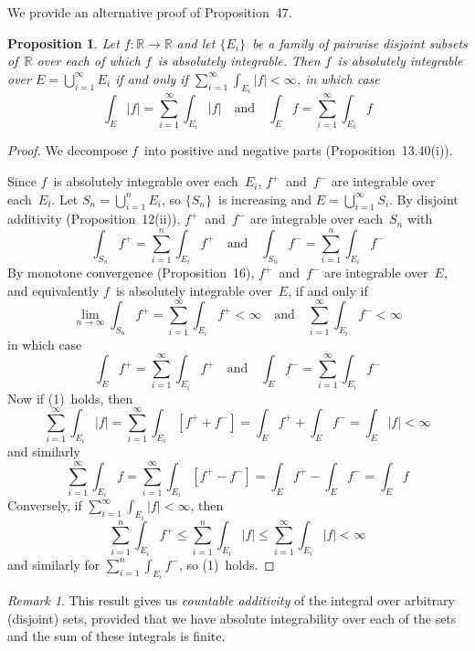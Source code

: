 \documentclass[letterpaper,12pt]{article}
\newcommand{\R}{\mathbb{R}}
\newcommand{\bigunion}{\bigcup}
\newcommand{\abs}[1]{|{#1}|}
\newcommand{\pos}[1]{#1^{+}}
\renewcommand{\neg}[1]{#1^{-}}
\theoremstyle{plain}
\newtheorem*{prop}{Proposition}
\theoremstyle{definition}
\theoremstyle{remark}
\newtheorem*{rmk}{Remark}
\begin{document}
\noindent We provide an alternative proof of Proposition~47.
\begin{prop}
Let \(f:\R\to\R\) and let \(\{E_i\}\)~be a family of pairwise disjoint subsets of~\(\R\) over each of which \(f\)~is absolutely integrable. Then \(f\)~is absolutely integrable over \(E=\bigunion_{i=1}^{\infty}E_i\) if and only if \(\sum_{i=1}^{\infty}\int_{E_i}\abs{f}<\infty\), in which case
\[\int_E\abs{f}=\sum_{i=1}^{\infty}\int_{E_i}\abs{f}\quad\text{and}\quad\int_E f=\sum_{i=1}^{\infty}\int_{E_i}f\]
\end{prop}
\begin{proof}
We decompose \(f\)~into positive and negative parts (Proposition~13.40(i)).

Since \(f\)~is absolutely integrable over each~\(E_i\), \(\pos{f}\)~and~\(\neg{f}\) are integrable over each~\(E_i\). Let \(S_n=\bigunion_{i=1}^n E_i\), so \(\{S_n\}\)~is increasing and \(E=\bigunion_{i=1}^{\infty}S_i\). By disjoint additivity (Proposition~12(ii)), \(\pos{f}\)~and~\(\neg{f}\) are integrable over each~\(S_n\) with
\[\int_{S_n}\pos{f}=\sum_{i=1}^n\int_{E_i}\pos{f}\quad\text{and}\quad\int_{S_n}\neg{f}=\sum_{i=1}^n\int_{E_i}\neg{f}\]
By monotone convergence (Proposition~16), \(\pos{f}\)~and~\(\neg{f}\) are integrable over~\(E\), and equivalently \(f\)~is absolutely integrable over~\(E\), if and only if
\[\lim_{n\to\infty}\int_{S_n}\pos{f}=\sum_{i=1}^{\infty}\int_{E_i}\pos{f}<\infty\quad\text{and}\quad\sum_{i=1}^{\infty}\int_{E_i}\neg{f}<\infty\tag{1}\]
in which case
\[\int_E\pos{f}=\sum_{i=1}^{\infty}\int_{E_i}\pos{f}\quad\text{and}\quad\int_E\neg{f}=\sum_{i=1}^{\infty}\int_{E_i}\neg{f}\]
Now if (1)~holds, then
\[\sum_{i=1}^{\infty}\int_{E_i}\abs{f}=\sum_{i=1}^{\infty}\int_{E_i}\left[\pos{f}+\neg{f}\right]=\int_E\pos{f}+\int_E\neg{f}=\int_E\abs{f}<\infty\]
and similarly
\[\sum_{i=1}^{\infty}\int_{E_i}f=\sum_{i=1}^{\infty}\int_{E_i}\left[\pos{f}-\neg{f}\right]=\int_E\pos{f}-\int_E\neg{f}=\int_E f\]
Conversely, if \(\sum_{i=1}^{\infty}\int_{E_i}\abs{f}<\infty\), then
\[\sum_{i=1}^n\int_{E_i}\pos{f}\le\sum_{i=1}^n\int_{E_i}\abs{f}\le\sum_{i=1}^{\infty}\int_{E_i}\abs{f}<\infty\]
and similarly for \(\sum_{i=1}^n\int_{E_i}\neg{f}\), so (1)~holds.
\end{proof}
\begin{rmk}
This result gives us \emph{countable additivity} of the integral over arbitrary (disjoint) sets, provided that we have absolute integrability over each of the sets and the sum of these integrals is finite.
\end{rmk}
\end{document}
